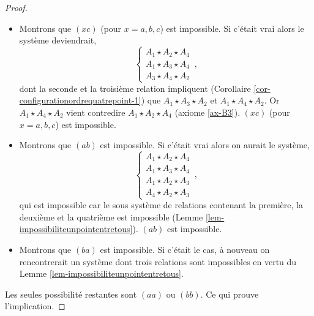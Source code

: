 \begin{cor}
\begin{proof}
\begin{itemize}[$\bullet$]
\begin{equation*}
\begin{array}{cc}
                     A_1 \star A_2 \star A_4  \\
                     A_1 \star A_3 \star A_4
                \end{array}\right.\,,
            \end{equation*}
            dont la première et la dernière relation impliquent (corrolaire \ref{cor-configurationordrequatrepoint-1}) que $A_3 \star A_1 \star A_4$ et $A_3 \star A_2 \star A_4$. Or $A_3 \star A_1 \star A_4$ vient contredire $A_1 \star A_3 \star A_4$ (axiome \ref{ax-B3}). $(cx)$ (pour $x=a,b,c$) est impossible.
            \item Montrons que $(xc)$ (pour $x=a,b,c$)  est impossible. Si c'était vrai alors le système deviendrait,
            \begin{equation*}
                \left\{\begin{array}{cc}
                     A_1 \star A_2 \star A_4  \\
                     A_1 \star A_3 \star A_4 \\
                     A_3 \star A_4 \star A_2
                \end{array}\right.\,,
            \end{equation*}    
            dont la seconde et la troisième relation impliquent (Corollaire \ref{cor-configurationordrequatrepoint-1}) que $A_1 \star A_3 \star A_2$ et $A_1 \star A_4 \star A_2$. Or $A_1 \star A_4 \star A_2$ vient contredire $A_1 \star A_2 \star A_4$ (axiome \ref{ax-B3}). $(xc)$ (pour $x=a,b,c$)  est impossible.
            \item Montrons que $(ab)$ est impossible. Si c'était vrai alors on aurait le système,
            \begin{equation*}
                \left\{\begin{array}{cc}
                     A_1 \star A_2 \star A_4 \\
                     A_1 \star A_3 \star A_4 \\
                     A_1 \star A_2 \star A_3 \\
                     A_4 \star A_2 \star A_3
                \end{array}\right.\,,
            \end{equation*}  
            qui est impossible car le sous système de relations contenant la première, la deuxième et la quatrième est impossible (Lemme \ref{lem-impossibiliteunpointentretous}). $(ab)$ est impossible.
            \item Montrons que $(ba)$ est impossible. Si c'était le cas, à nouveau on rencontrerait un système dont trois relations sont impossibles en vertu du Lemme \ref{lem-impossibiliteunpointentretous}.
        \end{itemize}
        Les seules possibilité restantes sont $(aa)$ ou $(bb)$. Ce qui prouve l'implication.


\end{proof}
\end{cor}
